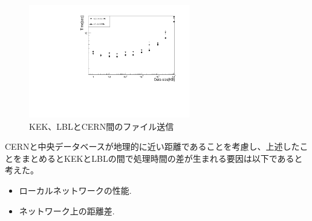 \begin{figure}[bpt]\centering
  \begin{center}
    \includegraphics[width=7cm,angle=270]{scp_to_cern.pdf}
  \caption[KEK、LBLとCERN間のファイル送信]{KEK、LBLとCERN間のファイル送信}
  \label{datasize_vs_time_cern}
  \end{center}
\end{figure}

CERNと中央データベースが地理的に近い距離であることを考慮し、上述したことをまとめるとKEKとLBLの間で処理時間の差が生まれる要因は以下であると考えた。
\begin{itemize}
  \item ローカルネットワークの性能.
  \item ネットワーク上の距離差.
\end{itemize}

